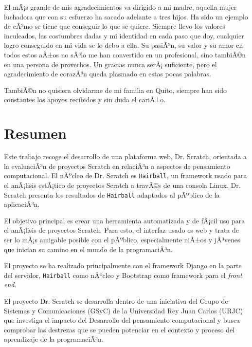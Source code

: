 \documentclass[a4paper, 12pt]{book}
\begin{document}
El mÃ¡s grande de mis agradecimientos va dirigido a mi madre, aquella mujer luchadora que
con su esfuerzo ha sacado adelante a tres hijos. Ha sido un ejemplo de cÃ³mo se tiene que
conseguir lo que se quiere. Siempre llevo los valores inculcados, las costumbres dadas y
mi identidad en cada paso que doy, cualquier logro conseguido en mi vida se lo debo a ella.
Su pasiÃ³n, su valor y su amor en todos estos aÃ±os no sÃ³lo me han convertido en un profesional,
sino tambiÃ©n en una persona de provechos. Un gracias nunca serÃ¡ suficiente, pero el
agradecimiento de corazÃ³n queda plasmado en estas pocas palabras.

TambiÃ©n no quisiera olvidarme de mi familia en Quito, siempre han sido constantes los apoyos
recibidos y sin duda el cariÃ±o.


\chapter*{Resumen}


Este trabajo recoge el desarrollo de una plataforma web, Dr. Scratch, orientada a la 
evaluaciÃ³n de proyectos Scratch en relaciÃ³n a aspectos de pensamiento computacional. 
El nÃºcleo de Dr. Scratch es \texttt{Hairball}, un framework usado para el anÃ¡lisis estÃ¡tico de 
proyectos Scratch a travÃ©s de una consola Linux. Dr. Scratch presenta los resultados
de \texttt{Hairball} adaptados al pÃºblico de la aplicaciÃ³n.

El objetivo principal es crear una herramienta automatizada y de fÃ¡cil uso para el 
anÃ¡lisis de proyectos Scratch. Para esto, el interfaz usado es web y trata de ser 
lo mÃ¡s amigable posible con el pÃºblico, especialmente niÃ±os y jÃ³venes que inician
su camino en el mundo de la programaciÃ³n.

El proyecto se ha realizado principalmente con el framework Django en la parte del
servidor, \texttt{Hairball} como nÃºcleo y Bootstrap como framework para el \emph{front end}.

El proyecto Dr. Scratch se desarrolla dentro de una iniciativa del Grupo de Sistemas
y Comunicaciones (GSyC) de la Universidad Rey Juan Carlos (URJC) que investiga el
impacto del Desarrollo del pensamiento computacional y busca comprobar las destrezas
que se pueden potenciar en el contexto y proceso del aprendizaje de la programaciÃ³n.
\end{document}
